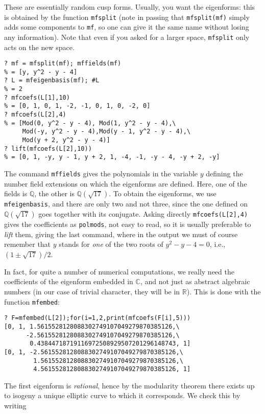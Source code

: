\documentclass[11pt]{article}
\newcommand{\Q}{{\mathbb Q}}
\newcommand{\R}{{\mathbb R}}
\newcommand{\C}{{\mathbb C}}
\def\kbd#1{{\tt #1}}
\begin{document}
These are essentially random cusp forms. Usually, you want the eigenforms:
this is obtained by the function \kbd{mfsplit} (note in passing that
\kbd{mfsplit(mf)} simply adds some components to \kbd{mf}, so one can
give it the same name without losing any information). Note that even if
you asked for a larger space, \kbd{mfsplit} only acts on the new space.

\begin{verbatim}
? mf = mfsplit(mf); mffields(mf)
% = [y, y^2 - y - 4]
? L = mfeigenbasis(mf); #L
% = 2
? mfcoefs(L[1],10)
% = [0, 1, 0, 1, -2, -1, 0, 1, 0, -2, 0]
? mfcoefs(L[2],4)
% = [Mod(0, y^2 - y - 4), Mod(1, y^2 - y - 4),\
     Mod(-y, y^2 - y - 4),Mod(y - 1, y^2 - y - 4),\
     Mod(y + 2, y^2 - y - 4)]
? lift(mfcoefs(L[2],10))
% = [0, 1, -y, y - 1, y + 2, 1, -4, -1, -y - 4, -y + 2, -y]
\end{verbatim}

The command \kbd{mffields} gives the polynomials in the variable $y$ defining
the number field extensions on which
the eigenforms are defined. Here, one of the fields is $\Q$, the other is
$\Q(\sqrt{17})$. To obtain the eigenforms, we use \kbd{mfeigenbasis}, and
there are only two and not three, since the one defined on $\Q(\sqrt{17})$
goes together with its conjugate. Asking directly \kbd{mfcoefs(L[2],4)} gives
the coefficients as \kbd{polmods}, not easy to read, so it is usually
preferable to \emph{lift} them, giving the last command, where in the output
we must of course remember that $y$ stands for \emph{one} of the two roots
of $y^2-y-4=0$, i.e., $(1\pm\sqrt{17})/2$.

In fact, for quite a number of numerical computations, we really need the
coefficients of the eigenform embedded in $\C$, and not just as abstract
algebraic numbers (in our case of trivial character, they will be in $\R$).
This is done with the function \kbd{mfembed}:

\begin{verbatim}
? F=mfembed(L[2]);for(i=1,2,print(mfcoefs(F[i],5)))
[0, 1, 1.5615528128088302749107049279870385126,\
      -2.5615528128088302749107049279870385126,\
       0.43844718719116972508929507201296148743, 1]
[0, 1, -2.5615528128088302749107049279870385126,\
        1.5615528128088302749107049279870385126,\
        4.5615528128088302749107049279870385126, 1]
\end{verbatim}

The first eigenform is \emph{rational}, hence by the modularity theorem there
exists up to isogeny a unique elliptic curve to which it corresponds.
We check this by writing
\end{document}
